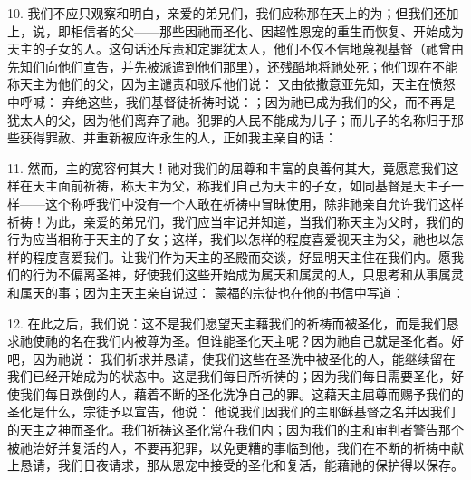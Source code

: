 10. 我们不应只观察和明白，亲爱的弟兄们，我们应称那在天上的为；但我们还加上，说，即相信者的父——那些因祂而圣化、因超性恩宠的重生而恢复、开始成为天主的子女的人。这句话还斥责和定罪犹太人，他们不仅不信地蔑视基督（祂曾由先知们向他们宣告，并先被派遣到他们那里），还残酷地将祂处死；他们现在不能称天主为他们的父，因为主谴责和驳斥他们说： 又由依撒意亚先知，天主在愤怒中呼喊： 弃绝这些，我们基督徒祈祷时说：；因为祂已成为我们的父，而不再是犹太人的父，因为他们离弃了祂。犯罪的人民不能成为儿子；而儿子的名称归于那些获得罪赦、并重新被应许永生的人，正如我主亲自的话：\par

11. 然而，主的宽容何其大！祂对我们的屈尊和丰富的良善何其大，竟愿意我们这样在天主面前祈祷，称天主为父，称我们自己为天主的子女，如同基督是天主子一样——这个称呼我们中没有一个人敢在祈祷中冒昧使用，除非祂亲自允许我们这样祈祷！为此，亲爱的弟兄们，我们应当牢记并知道，当我们称天主为父时，我们的行为应当相称于天主的子女；这样，我们以怎样的程度喜爱视天主为父，祂也以怎样的程度喜爱我们。让我们作为天主的圣殿而交谈，好显明天主住在我们内。愿我们的行为不偏离圣神，好使我们这些开始成为属天和属灵的人，只思考和从事属灵和属天的事；因为主天主亲自说过： 蒙福的宗徒也在他的书信中写道：\par

12. 在此之后，我们说：这不是我们愿望天主藉我们的祈祷而被圣化，而是我们恳求祂使祂的名在我们内被尊为圣。但谁能圣化天主呢？因为祂自己就是圣化者。好吧，因为祂说： 我们祈求并恳请，使我们这些在圣洗中被圣化的人，能继续留在我们已经开始成为的状态中。这是我们每日所祈祷的；因为我们每日需要圣化，好使我们每日跌倒的人，藉着不断的圣化洗净自己的罪。这藉天主屈尊而赐予我们的圣化是什么，宗徒予以宣告，他说： 他说我们因我们的主耶稣基督之名并因我们的天主之神而圣化。我们祈祷这圣化常在我们内；因为我们的主和审判者警告那个被祂治好并复活的人，不要再犯罪，以免更糟的事临到他，我们在不断的祈祷中献上恳请，我们日夜请求，那从恩宠中接受的圣化和复活，能藉祂的保护得以保存。\par

